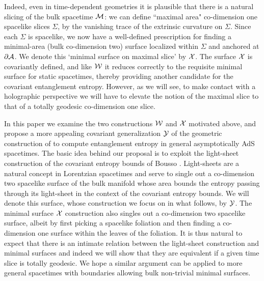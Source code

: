 \documentclass[12pt]{article}
\def\p{\partial}
\def\CA{{\cal A}}
\def\CW{{\cal W}}
\def\CX{{\cal X}}
\def\CY{{\cal Y}}
\def\CSig{{\Sigma}}
\def\p{\partial}
\def\p{\partial}
\def\bulk{{\cal M}}
\def\Gms{\CW}
\def\Lms{\CY}
\def\Xms{\CX}
\def\Sms{\CSig}
\def\brA{\p \CA}
\begin{document}
 Indeed, even in time-dependent geometries it is plausible  that there is a natural slicing of the bulk spacetime $\bulk$: we can define ``maximal area"
 co-dimension one spacelike slices $\Sms$, by the vanishing trace of the
  extrinsic curvature on $\Sms$.  Since each $\Sms$ is spacelike, we now have
   a well-defined prescription for finding a minimal-area (bulk co-dimension two)
   surface localized within $\Sms$ and anchored at $\brA$.
   We denote this `minimal surface on maximal slice' by $\Xms$.  The surface $\Xms$ is  covariantly defined, and like $\Gms$ it reduces correctly to the requisite minimal surface for static spacetimes, thereby providing another candidate for the covariant entanglement entropy.
 However, as we will see, to make contact with a holographic perspective we
     will have to elevate the notion of the maximal slice to that of a
     totally geodesic co-dimension one slice.

In this paper we examine the two constructions $\Gms$ and $\Xms$ motivated above, and propose a more appealing covariant generalization $\Lms$ of the geometric construction of \cite{Ryu:2006bv, Ryu:2006ef} to compute entanglement entropy in general asymptotically AdS spacetimes.  The basic idea behind our proposal is to exploit the light-sheet construction of the covariant entropy bounds of Bousso \cite{Bousso:1999xy, Bousso:1999cb, Bousso:2002ju}. Light-sheets are a natural concept in Lorentzian spacetimes and serve to single out a co-dimension two spacelike surface of the  bulk manifold whose area bounds the entropy passing through its light-sheet in the context of the covariant entropy bounds.
 We will denote this surface, whose construction we focus on in what follows, by $\Lms$.
 The minimal surface $\Xms$ construction also singles out a co-dimension two spacelike surface,
 albeit by first picking a spacelike foliation and then finding a co-dimension one surface within
 the leaves of the foliation. It is thus natural to expect that there is an intimate  relation
 between the light-sheet construction and minimal surfaces
 and indeed we will show that they are equivalent if a given time slice
 is totally geodesic. We  hope a similar argument can be applied to more general
spacetimes with boundaries allowing bulk non-trivial minimal surfaces.
\end{document}

